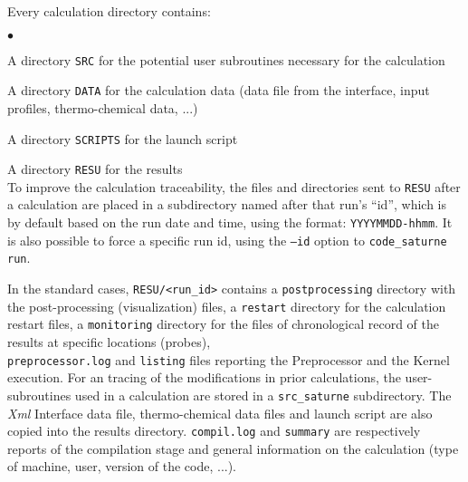 \noindent
Every calculation directory contains:
\begin{list}{$\bullet$}{}
\item A directory \texttt{SRC} for the potential user subroutines
      necessary for the calculation
\item A directory \texttt{DATA} for the calculation data (data
      file from the interface, input profiles, thermo-chemical data, ...)
\item A directory \texttt{SCRIPTS} for the launch script
\item A directory \texttt{RESU} for the results\\
To improve the calculation traceability, the files and directories
sent to \texttt{RESU} after a calculation are  placed in a subdirectory
named after that run's ``id'', which is by default based on the run date
and time, using the format: \texttt{YYYYMMDD-hhmm}.
It is also possible to force a specific run id, using the \texttt{--id}
option to \texttt{code\_saturne run}.
\end{list}

\noindent
In the standard cases, \texttt{RESU/<run\_id>} contains a
\texttt{postprocessing} directory with the post-processing
(visualization) files, a \texttt{restart} directory for the calculation
restart files, a \texttt{monitoring} directory for the files of chronological
record of the results at specific locations (probes),\\
\texttt{preprocessor.log} and \texttt{listing} files reporting the
Preprocessor and the Kernel execution. For an tracing of
the modifications in prior calculations, the user-subroutines used in
a calculation are stored in a \texttt{src\_saturne} subdirectory. The {\em Xml}
Interface data file, thermo-chemical data files and launch script are also
copied into the results directory. \texttt{compil.log} and
\texttt{summary} are respectively reports of the compilation stage and
general information on the calculation (type of machine, user,
version of the code, ...).

